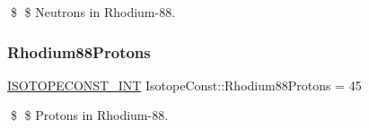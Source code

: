 \$ \$ Neutrons in Rhodium-\/88. \mbox{\label{group___isotope_const-_rhodium-_rh88_ga1cd43e1d65c0b47d1517fec0c1157082}} 
\subsubsection{\texorpdfstring{Rhodium88\+Protons}{Rhodium88Protons}}
{\footnotesize\ttfamily \mbox{\hyperlink{group___isotope_const-_macros_ga5f18360b3e99483a35c32d789e62621c}{I\+S\+O\+T\+O\+P\+E\+C\+O\+N\+S\+T\+\_\+\+I\+NT}} Isotope\+Const\+::\+Rhodium88\+Protons = 45}

\$ \$ Protons in Rhodium-\/88. 